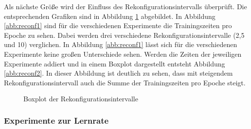  Als nächste Größe wird der Einfluss des Rekonfigurationsintervalls überprüft. Die entsprechenden Grafiken sind in Abbildung \ref{abb:reconf} abgebildet. In Abbildung \ref{abb:reconf1} sind für die verschiedenen Experimente die Trainingszeiten pro Epoche zu sehen. Dabei werden drei verschiedene Rekonfigurationsintervalle (2,5 und 10) verglichen. In Abbildung \ref{abb:reconf1} lässt sich für die verschiedenen Experimente keine großen Unterschiede sehen. Werden die Zeiten der jeweiligen Experimente addiert und in einem Boxplot dargestellt entsteht Abbildung \ref{abb:reconf2}. In dieser Abbildung ist deutlich zu sehen, dass mit steigendem Rekonfigurationsintervall auch die Summe der Trainingszeiten pro Epoche steigt.
 
 \begin{figure}[h]
 \centering
 \qquad
 \caption{Boxplot der Rekonfigurationsintervalle}
 \label{abb:reconf}
\end{figure}

\subsubsection{Experimente zur Lernrate}

